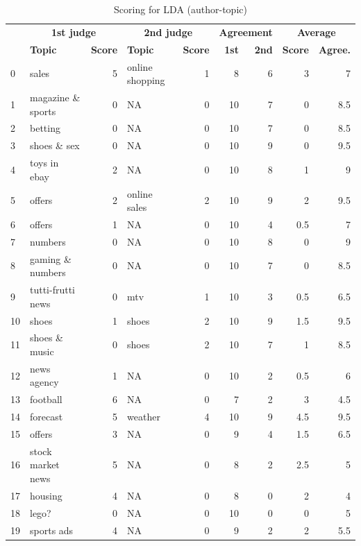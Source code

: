 \documentclass[11pt]{article}
\begin{document}
\begin{appendices}
\begin{table}[H]
	\centering
	\begin{tabular}{| l | l | r | l | r | r | r | r | r |}
		\hline
		& \multicolumn{2}{c|}{\textbf{1st judge}} & \multicolumn{2}{c|}{\textbf{2nd judge}} & \multicolumn{2}{c|}{\textbf{Agreement}} & \multicolumn{2}{c|}{\textbf{Average}}\\
        \cline{2-9}
         & \textbf{Topic} & \textbf{Score} & \textbf{Topic} & \textbf{Score} & \textbf{1st} & \textbf{2nd} & \textbf{Score} & \textbf{Agree.}\\
		\hline
            0 & sales & 5 & online shopping & 1 & 8 & 6 & 3 & 7\\
            1 & magazine \& sports & 0 & NA & 0 & 10 & 7 & 0 & 8.5\\
            2 & betting & 0 & NA & 0 & 10 & 7 & 0 & 8.5\\
            3 & shoes \& sex & 0 & NA & 0 & 10 & 9 & 0 & 9.5\\
            4 & toys in ebay & 2 & NA & 0 & 10 & 8 & 1 & 9\\
            5 & offers & 2 & online sales & 2 & 10 & 9 & 2 & 9.5\\
            6 & offers & 1 & NA & 0 & 10 & 4 & 0.5 & 7\\
            7 & numbers & 0 & NA & 0 & 10 & 8 & 0 & 9\\
            8 & gaming \& numbers & 0 & NA & 0 & 10 & 7 & 0 & 8.5\\
            9 & tutti-frutti news & 0 & mtv & 1 & 10 & 3 & 0.5 & 6.5\\
            10 & shoes & 1 & shoes & 2 & 10 & 9 & 1.5 & 9.5\\
            11 & shoes \& music & 0 & shoes & 2 & 10 & 7 & 1 & 8.5\\
            12 & news agency & 1 & NA & 0 & 10 & 2 & 0.5 & 6\\
            13 & football & 6 & NA & 0 & 7 & 2 & 3 & 4.5\\
            14 & forecast & 5 & weather & 4 & 10 & 9 & 4.5 & 9.5\\
            15 & offers & 3 & NA & 0 & 9 & 4 & 1.5 & 6.5\\
            16 & stock market news & 5 & NA & 0 & 8 & 2 & 2.5 & 5\\
            17 & housing & 4 & NA & 0 & 8 & 0 & 2 & 4\\
            18 & lego? & 0 & NA & 0 & 10 & 0 & 0 & 5\\
            19 & sports ads & 4 & NA & 0 & 9 & 2 & 2 & 5.5\\
		\hline
	\end{tabular}
	\caption{Scoring for LDA (author-topic)}
	\label{tb:res_lda_grp}
\end{table}


\end{appendices}
\end{document}
